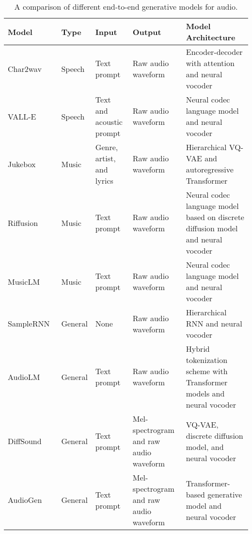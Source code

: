 \begin{table}[ht]
\centering
\caption{A comparison of different end-to-end generative models for audio.}
\begin{tabularx}{\textwidth}{|l|l|X|X|X|}
\hline
\textbf{Model} & \textbf{Type} & \textbf{Input}            & \textbf{Output}                        & \textbf{Model Architecture}                                                      \\ \hline
Char2wav~\cite{sotelo_char2wav_2017}       & Speech        & Text prompt               & Raw audio waveform                     & Encoder-decoder with attention and neural vocoder                                \\ \hline
VALL-E~\cite{wang_neural_2023}         & Speech        & Text and acoustic prompt  & Raw audio waveform                     & Neural codec language model and neural vocoder                                   \\ \hline
Jukebox~\cite{dhariwal_jukebox_2020}        & Music         & Genre, artist, and lyrics & Raw audio waveform                     & Hierarchical VQ-VAE and autoregressive Transformer                               \\ \hline
Riffusion~\cite{forsgren_riffusion_2022}      & Music         & Text prompt               & Raw audio waveform                     & Neural codec language model based on discrete diffusion model and neural vocoder \\ \hline
MusicLM~\cite{agostinelli_musiclm_2023}        & Music         & Text prompt               & Raw audio waveform                     & Neural codec language model and neural vocoder                                   \\ \hline
SampleRNN~\cite{mehri_samplernn_2017}      & General       & None                      & Raw audio waveform                     & Hierarchical RNN and neural vocoder                                              \\ \hline
AudioLM~\cite{borsos_audiolm_2022}        & General       & Text prompt               & Raw audio waveform                     & Hybrid tokenization scheme with Transformer models and neural vocoder            \\ \hline
DiffSound~\cite{yang_diffsound_2022}      & General       & Text prompt               & Mel-spectrogram and raw audio waveform & VQ-VAE, discrete diffusion model, and neural vocoder                             \\ \hline
AudioGen~\cite{kreuk_audiogen_2023}       & General       & Text prompt               & Mel-spectrogram and raw audio waveform & Transformer-based generative model and neural vocoder                            \\ \hline
\end{tabularx}
\label{tab:end-to-end-audio-models}
\end{table}

